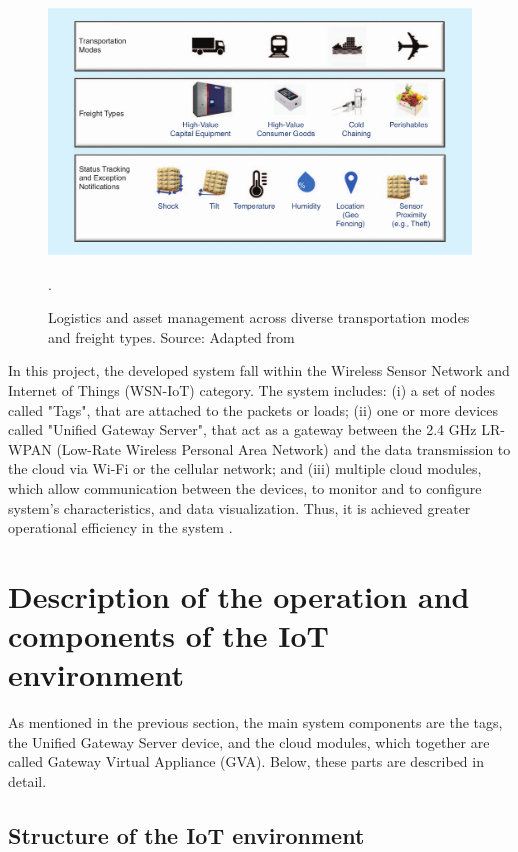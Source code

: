 \documentclass[journal]{IEEEtran}	%
\begin{document}
\begin{figure}[t!]
\centering
\includegraphics[width=1.0\columnwidth]{fig1.png}
\caption{Logistics and asset management across diverse transportation modes and freight types. Source: Adapted from \cite{williams2017weaving}}.
\label{fig:logistic1}
\end{figure}

In this project, the developed system fall within the Wireless Sensor Network and Internet of Things (WSN-IoT) category. The system includes: (i) a set of nodes called "Tags", that are attached to the packets or loads; (ii) one or more devices called "Unified Gateway Server", that act as a gateway between the 2.4 GHz LR-WPAN (Low-Rate Wireless Personal Area Network) and the data transmission to the cloud via Wi-Fi or the cellular network; and (iii) multiple cloud modules, which allow communication between  the devices, to monitor and to configure system's characteristics, and data visualization. Thus, it is achieved greater operational efficiency in the system \cite{williams2017weaving}.


\section{Description of the operation and components of the IoT environment}


As mentioned in the previous section, the main system components are the tags, the Unified Gateway Server device, and the cloud modules, which together are called Gateway Virtual Appliance (GVA). Below, these parts are described in detail.


\subsection{Structure of the IoT environment}
\end{document}
